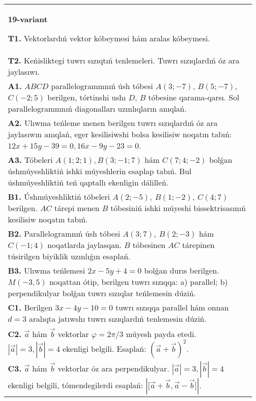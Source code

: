 \documentclass{article}
\begin{document}
\begin{tabular}{m{17cm}}
\textbf{19-variant}

\textbf{T1.} 
Vektorlardıń vektor kóbeymesi hám aralas kóbeymesi.
 \\
\textbf{T2.} 
Keńisliktegi tuwrı sızıqtıń tenlemeleri. Tuwrı sızıqlardıń óz ara jaylasıwı.
 \\
\textbf{A1.} 
$ABCD$ parallelogrammnıń úsh tóbesi $A (3; -7) $,
$B (5; -7) $, $C (-2; 5) $ berilgen, tórtinshi ushı $D$,
$B$ tóbesine qarama-qarsı. Sol parallelogrammnıń diagonalları
uzınlıqların anıqlań.
 \\
\textbf{A2.} 
Ulıwma teńleme menen berilgen tuwrı sızıqlardıń
óz ara jaylasıwın anıqlań, eger kesilisiwshi bolsa kesilisiw noqatın
tabıń: $12x+15y-39=0, 16x-9y-23=0$.
 \\
\textbf{A3.} 
Tóbeleri $A (1;2;1), B (3;-1;7) $ hám $C (7;4;-2) $ bolǵan úshmúyeshliktiń
ishki múyeshlerin esaplap tabıń. Bul úshmúyeshliktiń teń qaptallı ekenligin dálilleń.
 \\
\textbf{B1.} 
Úshmúyeshliktiń tóbeleri \(A (2;-5),\ B (1;-2),\ C (4;7) \)
berilgen. $AC$ tárepi menen $B$ tóbesiniń ishki múyeshi
bissektrisasınıń kesilisiw noqatın tabıń.
 \\
\textbf{B2.} 
Parallelogramnıń úsh tóbesi \(A (3;7),\ B (2;-3) \) hám
\(C (-1;4) \) noqatlarda jaylasqan. $B$ tóbesinen $AC$
tárepinen túsirilgen biyiklik uzınlıǵın esaplań.
 \\
\textbf{B3.} 
Ulıwma teńlemesi \(2x-5y+4=0\) bolǵan durıs
berilgen. \(M (-3,5) \) noqattan ótip, berilgen tuwrı sızıqqa: a) parallel;
b) perpendikulyar bolǵan tuwrı sızıqlar teńlemesin dúziń.
 \\
\textbf{C1.} 
Berilgen \(3x-4y-10=0\) tuwrı sızıqqa parallel hám onnan
$d=3$ aralıqta jatıwshı tuwrı sızıqlardıń tenlemesin dúziń.
 \\
\textbf{C2.} 
$\vec{a}$ hám $\vec{b}$ vektorlar $\varphi = 2\pi/3$ múyesh payda etedi. $|\vec{a}| = 3,|\vec{b}| = 4$ ekenligi belgili. Esaplań:
$ (\vec{a} + \vec{b}) ^{2}$.
 \\
\textbf{C3.} 
$\vec{a}$ hám $\vec{b}$ vektorlar óz ara perpendikulyar. $|\vec{a}| = 3,|\vec{b}| = 4$ ekenligi belgili, tómendegilerdi esaplań:
$|\lbrack\vec{a} + \vec{b},\vec{a} - \vec{b}\rbrack|$.
 \\

\end{tabular}
\vspace{1cm}
\end{document}
